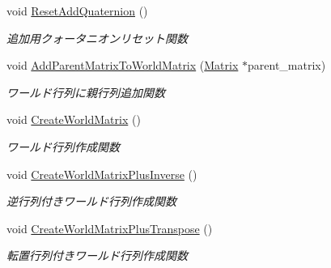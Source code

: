 \begin{DoxyCompactItemize}
void \mbox{\hyperlink{class_transform_acb3b15a0b011f21a849ca1648ed1c581}{Reset\+Add\+Quaternion}} ()
\begin{DoxyCompactList}\small\item\em 追加用クォータニオンリセット関数 \end{DoxyCompactList}\item 
void \mbox{\hyperlink{class_transform_afba4a9bc17c9a61f2c6a43bc32a251cc}{Add\+Parent\+Matrix\+To\+World\+Matrix}} (\mbox{\hyperlink{class_matrix}{Matrix}} $\ast$parent\+\_\+matrix)
\begin{DoxyCompactList}\small\item\em ワールド行列に親行列追加関数 \end{DoxyCompactList}\item 
void \mbox{\hyperlink{class_transform_a81a4882eb3c4d7afb243b9911c666b52}{Create\+World\+Matrix}} ()
\begin{DoxyCompactList}\small\item\em ワールド行列作成関数 \end{DoxyCompactList}\item 
void \mbox{\hyperlink{class_transform_a26e42d4a1bd35070277b49a48ef5c4fd}{Create\+World\+Matrix\+Plus\+Inverse}} ()
\begin{DoxyCompactList}\small\item\em 逆行列付きワールド行列作成関数 \end{DoxyCompactList}\item 
void \mbox{\hyperlink{class_transform_a49d2df9c3ffffa21e2df60ce2f531bca}{Create\+World\+Matrix\+Plus\+Transpose}} ()
\begin{DoxyCompactList}\small\item\em 転置行列付きワールド行列作成関数 \end{DoxyCompactList}\end{DoxyCompactItemize}
